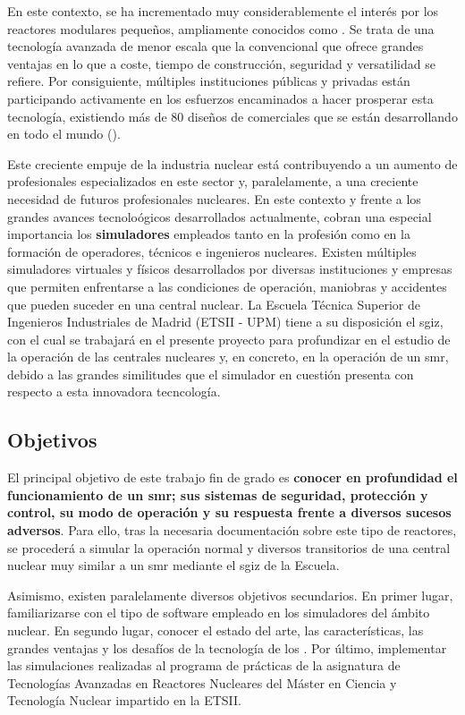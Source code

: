 En este contexto, se ha incrementado muy considerablemente el interés por los reactores modulares pequeños, ampliamente conocidos como \textbf{\emph{}}. Se trata de una tecnología avanzada de menor escala que la convencional que ofrece grandes ventajas en lo que a coste, tiempo de construcción, seguridad y versatilidad se refiere. Por consiguiente, múltiples instituciones públicas y privadas están participando activamente en los esfuerzos encaminados a hacer prosperar esta tecnología, existiendo más de 80 diseños de  comerciales que se están desarrollando en todo el mundo (\cite{smr_oiea}).

Este creciente empuje de la industria nuclear está contribuyendo a un aumento de profesionales especializados en este sector y, paralelamente, a una creciente necesidad de futuros profesionales nucleares. En este contexto y frente a los grandes avances tecnoloógicos desarrollados actualmente, cobran una especial importancia los \textbf{\gls{simuladores}} empleados tanto en la profesión como en la formación de operadores, técnicos e ingenieros nucleares. Existen múltiples simuladores virtuales y físicos desarrollados por diversas instituciones y empresas que permiten enfrentarse a las condiciones de operación, maniobras y accidentes que pueden suceder en una central nuclear. La Escuela Técnica Superior de Ingenieros Industriales de Madrid (ETSII - UPM) tiene a su disposición el \acrfull{sgiz}, con el cual se trabajará en el presente proyecto para profundizar en el estudio de la operación de las centrales nucleares y, en concreto, en la operación de un \acrshort{smr}, debido a las grandes similitudes que el simulador en cuestión presenta con respecto a esta innovadora tecncología.

\subsection{Objetivos}

El principal objetivo de este trabajo fin de grado es \textbf{conocer en profundidad el funcionamiento de un \acrshort{smr}; sus sistemas de seguridad, protección y control, su modo de operación y su respuesta frente a diversos sucesos adversos}. Para ello, tras la necesaria documentación sobre este tipo de reactores, se procederá a simular la operación normal y diversos transitorios de una central nuclear muy similar a un \acrshort{smr} mediante el \acrshort{sgiz} de la Escuela.

Asimismo, existen paralelamente diversos objetivos secundarios. En primer lugar, familiarizarse con el tipo de software empleado en los simuladores del ámbito nuclear. En segundo lugar, conocer el estado del arte, las características, las grandes ventajas y los desafíos de la tecnología de los . Por último, implementar las simulaciones realizadas al programa de prácticas de la asignatura de Tecnologías Avanzadas en Reactores Nucleares del Máster en Ciencia y Tecnología Nuclear impartido en la ETSII.

